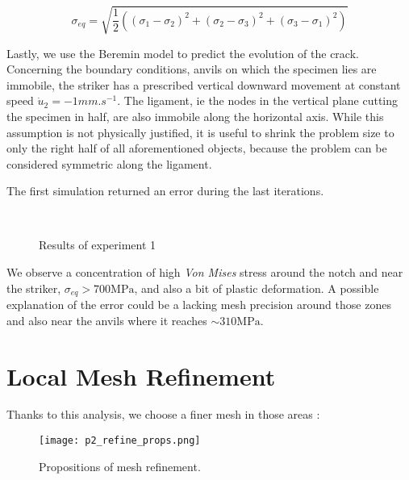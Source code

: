\documentclass[
10pt, %
a4paper, %
oneside, %
headinclude,footinclude, %
BCOR5mm, %
]{scrartcl}
\begin{document}
\begin{equation}
    \sigma_{eq} = \sqrt{\frac{1}{2}\left((\sigma_1 - \sigma_2)^2+(\sigma_2 - \sigma_3)^2+(\sigma_3 - \sigma_1)^2\right)}
\end{equation}

Lastly, we use the Beremin model to predict the evolution of the crack.
Concerning the boundary conditions, anvils on which the specimen lies
are immobile, the striker has a prescribed vertical downward movement at
constant speed $\dot{u}_2 = -1 mm.s^{-1}$. The ligament, ie the nodes
in the vertical plane cutting the specimen in half, are also immobile
along the horizontal axis.
While this assumption is not physically justified, it is useful to
shrink the problem size to only the right half of all aforementioned
objects, because the problem can be considered symmetric along the ligament.


The first simulation returned an error during the last iterations.

\begin{figure}[ht]
    \centering
    \hfill
    \\
    \hfill
    \caption{Results of experiment 1}
    \label{fig:res_exp_1}
\end{figure}

We observe a concentration of high \textit{Von Mises} stress
around the notch and near the striker, $\sigma_{eq} > 700 \text{MPa}$, and
also a bit of
plastic deformation.
A possible explanation of the error could be a lacking mesh precision
around those zones and also near the anvils where it reaches
$\sim 310 \text{MPa}$.

\section{Local Mesh Refinement}

Thanks to this analysis, we choose a finer mesh in those areas :

\begin{figure}[h]
    \centering
    \texttt{[image: p2\_refine\_props.png]}
    \caption{Propositions of mesh refinement.}
\end{figure}
\end{document}

